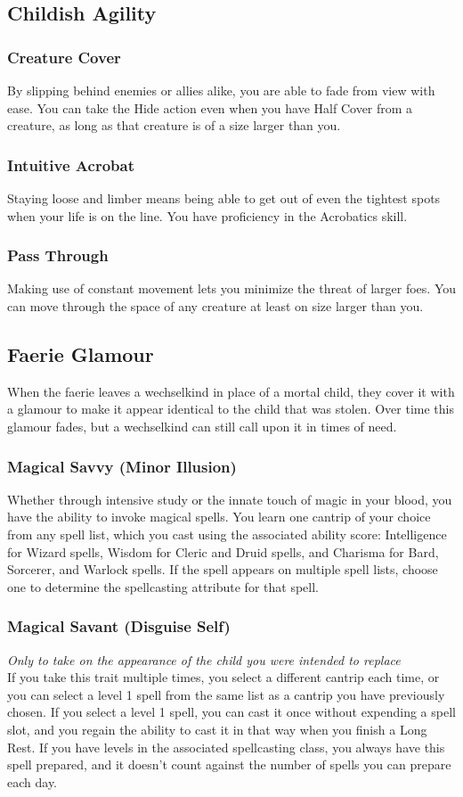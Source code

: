 \documentclass[letterpaper,openany,oneside,twocolumn]{book}
\begin{document}
\subsection*{Childish Agility}
\subsubsection*{Creature Cover}
By slipping behind enemies or allies alike, you are able to fade from view with ease. You can take the Hide action even when you have Half Cover from a creature, as long as that creature is of a size larger than you.
\subsubsection*{Intuitive Acrobat}
Staying loose and limber means being able to get out of even the tightest spots when your life is on the line. You have proficiency in the Acrobatics skill.
\subsubsection*{Pass Through}
Making use of constant movement lets you minimize the threat of larger foes. You can move through the space of any creature at least on size larger than you.
\subsection*{Faerie Glamour}
When the faerie leaves a wechselkind in place of a mortal child, they cover it with a glamour to make it appear identical to the child that was stolen. Over time this glamour fades, but a wechselkind can still call upon it in times of need.
\subsubsection*{Magical Savvy (Minor Illusion)}
Whether through intensive study or the innate touch of magic in your blood, you have the ability to invoke magical spells. You learn one cantrip of your choice from any spell list, which you cast using the associated ability score: Intelligence for Wizard spells, Wisdom for Cleric and Druid spells, and Charisma for Bard, Sorcerer, and Warlock spells. If the spell appears on multiple spell lists, choose one to determine the spellcasting attribute for that spell.
\subsubsection*{Magical Savant (Disguise Self)}
\textit{Only to take on the appearance of the child you were intended to replace}\\
If you take this trait multiple times, you select a different cantrip each time, or you can select a level 1 spell from the same list as a cantrip you have previously chosen. If you select a level 1 spell, you can cast it once without expending a spell slot, and you regain the ability to cast it in that way when you finish a Long Rest. If you have levels in the associated spellcasting class, you always have this spell prepared, and it doesn't count against the number of spells you can prepare each day.
\end{document}

